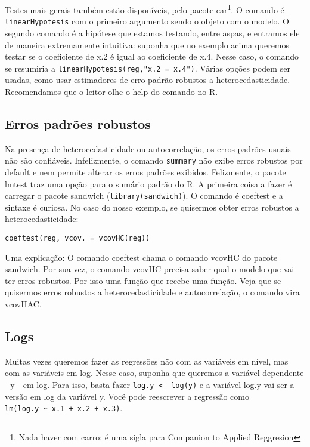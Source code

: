 \documentclass[]{book}
\let\rmarkdownfootnote\footnote%
\def\footnote{\protect\rmarkdownfootnote}
\begin{document}
Testes mais gerais também estão disponíveis, pelo pacote car\footnote{Nada
  haver com carro: é uma sigla para Companion to Applied Reggresion}. O
comando é \texttt{linearHypotesis} com o primeiro argumento sendo o
objeto com o modelo. O segundo comando é a hipótese que estamos
testando, entre aspas, e entramos ele de maneira extremamente intuitiva:
suponha que no exemplo acima queremos testar se o coeficiente de x.2 é
igual ao coeficiente de x.4. Nesse caso, o comando se resumiria a
\texttt{linearHypotesis(reg,"x.2\ =\ x.4")}. Várias opções podem ser
usadas, como usar estimadores de erro padrão robustos a
heterocedasticidade. Recomendamos que o leitor olhe o help do comando no
R.

\subsection{Erros padrões robustos}\label{erros-padroes-robustos}

Na presença de heterocedasticidade ou autocorrelação, os erros padrões
usuais não são confiáveis. Infelizmente, o comando \texttt{summary} não
exibe erros robustos por default e nem permite alterar os erros padrões
exibidos. Felizmente, o pacote lmtest traz uma opção para o sumário
padrão do R. A primeira coisa a fazer é carregar o pacote sandwich
(\texttt{library(sandwich)}). O comando é coeftest e a sintaxe é
curiosa. No caso do nosso exemplo, se quisermos obter erros robustos a
heterocedasticidade:

\begin{verbatim}
coeftest(reg, vcov. = vcovHC(reg))
\end{verbatim}

Uma explicação: O comando coeftest chama o comando vcovHC do pacote
sandwich. Por sua vez, o comando vcovHC precisa saber qual o modelo que
vai ter erros robustos. Por isso uma função que recebe uma função. Veja
que se quisermos erros robustos a heterocedasticidade e autocorrelação,
o comando vira vcovHAC.

\subsection{Logs}\label{logs}

Muitas vezes queremos fazer as regressões não com as variáveis em nível,
mas com as variáveis em log. Nesse caso, suponha que queremos a variável
dependente - y - em log. Para isso, basta fazer
\texttt{log.y\ \textless{}-\ log(y)} e a variável log.y vai ser a versão
em log da variável y. Você pode reescrever a regressão como
\texttt{lm(log.y\ \textasciitilde{}\ x.1\ +\ x.2\ +\ x.3)}.
\end{document}
